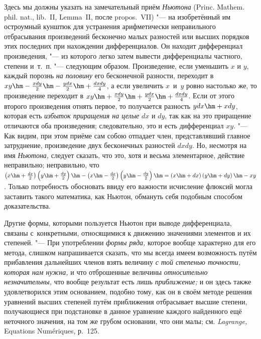 Здесь мы должны указать на замечательный приём {\em Ньютона} (Princ. Mathem.
phil. nat., lib.~II, Lemma~II, после propos.~VII) "--- на изобретённый им
остроумный кунштюк для устранения арифметически неправильного отбрасывания
произведений бесконечно малых разностей или высших порядков этих последних при
нахождении дифференциалов. Он находит дифференциал произведения, "--- из
которого легко затем вывести дифференциалы частного, степени и~т.~п. "---
следующим образом. Произведение, если уменьшить $x$ и $y$, каждый порознь
{\em на половину} его бесконечной разности, переходит в
$xy\hm-\frac{xdy}2\hm-\frac{ydx}2\hm+\frac{dxdy}4$, а если увеличить
$x$~и~$y$ ровно настолько же, то произведение переходит в
$xy\hm+\frac{xdy}2\hm+\frac{ydx}2\hm+\frac{dxdy}4$. Если от этого второго
произведения отнять первое, то получается разность $ydx\hm+xdy$, которая есть
{\em избыток приращения на целые} $dx$ и $dy$, так как на это приращение
отличаются оба произведения; следовательно, это и есть дифференциал $xy$. "---
Как видим, при этом приёме сам собою отпадает член, представлявший главное
затруднение, произведение двух бесконечных разностей $dxdy$. Но, несмотря на
имя {\em Ньютона,} следует сказать, что это, хотя и весьма элементарное,
действие неправильно; неправильно, что
$\left(x\hm+\frac{dx}2\right)\left(y\hm+\frac{dy}2\right)\hm-
\left(x\hm-\frac{dx}2\right)\left(y\hm-\frac{dy}2\right)\hm=
\left(x\hm+dx\right)\left(y\hm+dy\right)\hm-xy$. Только потребность обосновать
ввиду его важности исчисление флюксий могла заставить такого математика, как
Ньютон, обмануть себя подобным способом доказательства.

Другие формы, которыми пользуется Ньютон при выводе дифференциала, связаны
с~конкретными, относящимися к движению значениями элементов и их степеней. "---
При употреблении {\em формы ряда,} которое вообще характерно для его метода,
слишком напрашивается сказать, что мы всегда имеем возможность путём
прибавления дальнейших членов взять величину {\em с той степенью точности,}
{\em которая нам нужна,} и что отброшенные величины {\em относительно
незначительны,} что вообще результат есть лишь {\em приближение;} и он здесь
также удовлетворился этим основанием, подобно тому, как он в своём методе
решения уравнений высших степеней путём приближения отбрасывает высшие
степени, получающиеся при подстановке в данное уравнение каждого найденного
ещё неточного значения, на том же грубом основании, что они малы;
см. {\em Lagrange,} Equa\-tions Nu\-méri\-ques, р.~125.

